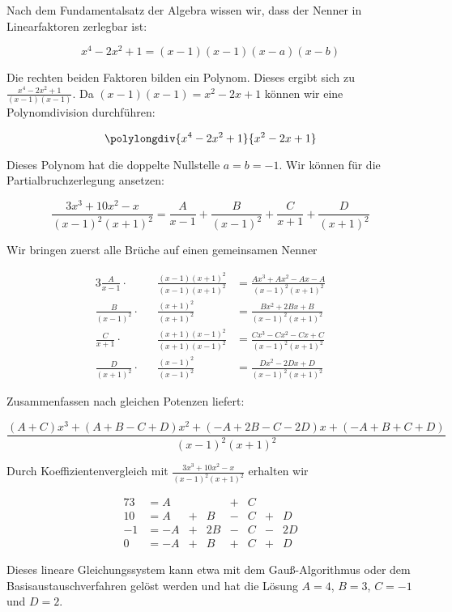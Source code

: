\item Nach dem Fundamentalsatz der Algebra wissen wir, dass der Nenner in Linearfaktoren zerlegbar ist:

$$
	x^4-2x^2+1 = (x-1)(x-1)(x-a)(x-b)
$$

Die rechten beiden Faktoren bilden ein Polynom. Dieses ergibt sich zu $\frac{x^4-2x^2+1}{(x-1)(x-1)}$. Da $(x-1)(x-1)=x^2-2x+1$ können wir eine Polynomdivision durchführen:

\[\polylongdiv{x^4-2x^2+1}{x^2-2x+1}\]

Dieses Polynom hat die doppelte Nullstelle $a=b=-1$. Wir können für die Partialbruchzerlegung ansetzen:

$$
	\frac{3x^3+10x^2-x}{(x-1)^2(x+1)^2} = \frac{A}{x-1} + \frac{B}{(x-1)^2} + \frac{C}{x+1} + \frac{D}{(x+1)^2}
$$

Wir bringen zuerst alle Brüche auf einen gemeinsamen Nenner

\begin{alignat*}{3}
	\frac{A}{x-1}     \cdot && \frac{(x-1)(x+1)^2}{(x-1)(x+1)^2} &= \frac{Ax^3+Ax^2-Ax-A}{(x-1)^2(x+1)^2} \\
	\frac{B}{(x-1)^2} \cdot && \frac{(x+1)^2}{(x+1)^2}           &= \frac{Bx^2+2Bx+B}{(x-1)^2(x+1)^2} \\
	\frac{C}{x+1}     \cdot && \frac{(x+1)(x-1)^2}{(x+1)(x-1)^2} &= \frac{Cx^3-Cx^2-Cx+C}{(x-1)^2(x+1)^2} \\
	\frac{D}{(x+1)^2} \cdot && \frac{(x-1)^2}{(x-1)^2}           &= \frac{Dx^2-2Dx+D}{(x-1)^2(x+1)^2} 
\end{alignat*}

Zusammenfassen nach gleichen Potenzen liefert:

$$
	\frac{(A+C)x^3+(A+B-C+D)x^2+(-A+2B-C-2D)x+(-A+B+C+D)}{(x-1)^2(x+1)^2}
$$

Durch Koeffizientenvergleich mit $\frac{3x^3+10x^2-x}{(x-1)^2(x+1)^2}$ erhalten wir

\begin{alignat*}{7}
	3  &= A  &   &    & + & C &   &    \\
	10 &= A  & + &  B & - & C & + &  D \\
	-1 &= -A & + & 2B & - & C & - & 2D \\
	0  &= -A & + &  B & + & C & + &  D
\end{alignat*}

Dieses lineare Gleichungssystem kann etwa mit dem Gauß-Algorithmus oder dem Basisaustauschverfahren gelöst werden und hat die Lösung $A=4$, $B=3$, $C=-1$ und $D=2$.

